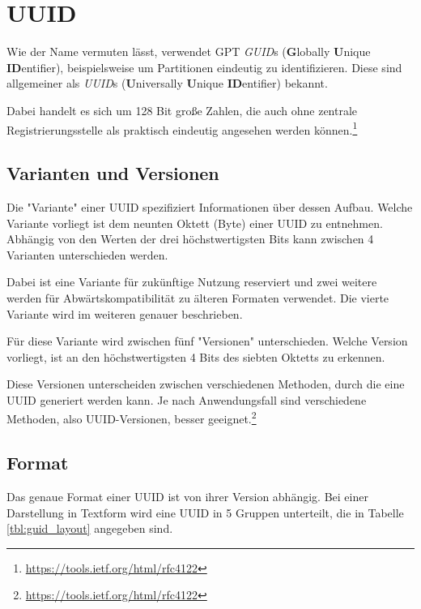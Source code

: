 \section{UUID}

Wie der Name vermuten lässt, verwendet GPT \textit{GUID}s (\textbf{G}lobally \textbf{U}nique \textbf{ID}entifier), beispielsweise um Partitionen eindeutig zu identifizieren.
Diese sind allgemeiner als \textit{UUID}s (\textbf{U}niversally \textbf{U}nique \textbf{ID}entifier) bekannt. 

Dabei handelt es sich um 128 Bit große Zahlen, die auch ohne zentrale Registrierungsstelle als praktisch eindeutig angesehen werden können.\footnote{\url{https://tools.ietf.org/html/rfc4122}}

\subsection{Varianten und Versionen}
\label{sec:guid:variants}

Die "Variante" einer UUID spezifiziert Informationen über dessen Aufbau.
Welche Variante vorliegt ist dem neunten Oktett (Byte) einer UUID zu entnehmen.
Abhängig von den Werten der drei höchstwertigsten Bits kann zwischen 4 Varianten unterschieden werden.

Dabei ist eine Variante für zukünftige Nutzung reserviert und zwei weitere werden für Abwärtskompatibilität zu älteren Formaten verwendet. 
Die vierte Variante wird im weiteren genauer beschrieben.

Für diese Variante wird zwischen fünf "Versionen" unterschieden.
Welche Version vorliegt, ist an den höchstwertigsten 4 Bits des siebten Oktetts zu erkennen.

Diese Versionen unterscheiden zwischen verschiedenen Methoden, durch die eine UUID generiert werden kann.
Je nach Anwendungsfall sind verschiedene Methoden, also UUID-Versionen, besser geeignet.\footnote{\url{https://tools.ietf.org/html/rfc4122}}


\subsection{Format}
\label{sec:guid:format}

Das genaue Format einer UUID ist von ihrer Version abhängig.
Bei einer Darstellung in Textform wird eine UUID in 5 Gruppen unterteilt, die in Tabelle \ref{tbl:guid_layout} angegeben sind.

